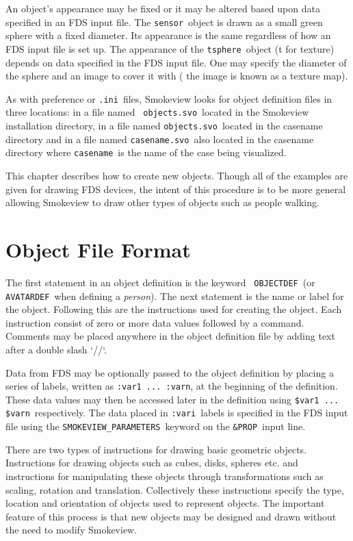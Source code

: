 \documentclass[11pt,twoside]{book}
\begin{document}
An object's appearance may be fixed or it may be altered based
upon data specified in an FDS input file.  The {\tt sensor}\
object is drawn as a small green sphere with a fixed diameter.
Its appearance is the same regardless of how an FDS input file is
set up. The appearance of the {\tt tsphere}\ object (t for
texture) depends on data specified in the FDS input file.  One may
specify the diameter of the sphere and an image to cover it with (
the image is known as a texture map).

As with preference or {\tt .ini}\ files, Smokeview looks for
object definition files in three locations: in a file named {\tt
objects.svo}\ located in the Smokeview installation directory, in
a file named {\tt objects.svo}\ located in the casename directory
and in a file named {\tt casename.svo}\ also located in the
casename directory where {\tt casename}\ is the name of the case
being visualized.

This chapter describes how to create new objects. Though all of
the examples are given for drawing FDS devices, the intent of this
procedure is to be more general allowing Smokeview to draw other
types of objects such as people walking.

\section{Object File Format}
The first statement in an object definition is the keyword {\tt
OBJECTDEF}\ (or {\tt AVATARDEF}\ when defining a {\em person}). The
next statement is the name or label for the object. Following this
are the instructions used for creating the object. Each
instruction consist of zero or more data values followed by a
command. Comments may be placed anywhere in the object definition
file by adding text after a double slash `//`.

Data from FDS may be optionally passed to the object definition by
placing a series of labels, written as {\tt :var1 ... :varn}, at
the beginning of the definition.  These data values may then be
accessed later in the definition using {\tt \$var1 ... \$varn}\
respectively. The data placed in {\tt :vari}\ labels is specified
in the FDS input  file using the {\tt SMOKEVIEW\_PARAMETERS}\
keyword on the {\tt \&PROP}\ input line.

There are two types of instructions for drawing basic geometric
objects.  Instructions for drawing objects such as cubes, disks,
spheres etc.  and instructions for manipulating these objects
through transformations such as scaling, rotation and translation.
Collectively these instructions specify the type, location and
orientation of objects used to represent objects.  The important
feature of this process is that new objects may be designed and
drawn without the need to modify Smokeview.
\end{document}
